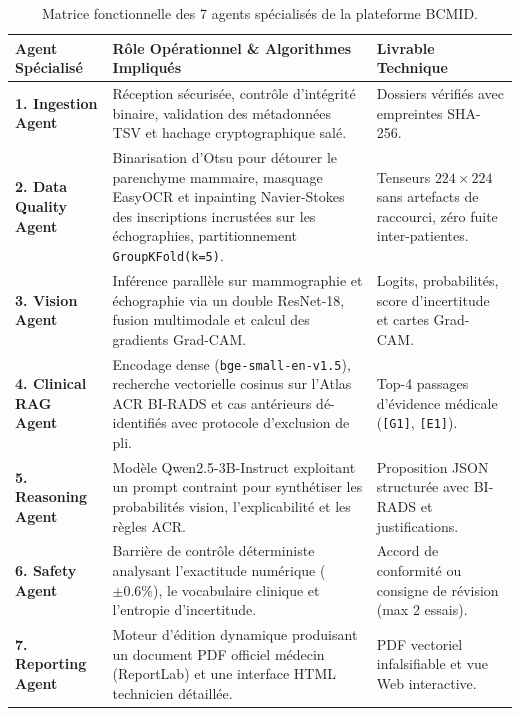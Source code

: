\documentclass[11pt,a4paper]{article}
\begin{document}
\begin{table}[htbp]
\centering
\small
\renewcommand{\arraystretch}{1.25}
\caption{Matrice fonctionnelle des 7 agents spécialisés de la plateforme BCMID.}
\label{tab:mas_matrix}
\begin{tabularx}{\linewidth}{|l|X|p{4.2cm}|}
\hline
\rowcolor{LightBlueBg}
\textbf{Agent Spécialisé} & \textbf{Rôle Opérationnel \& Algorithmes Impliqués} & \textbf{Livrable Technique} \\
\hline
\textbf{1. Ingestion Agent} & Réception sécurisée, contrôle d'intégrité binaire, validation des métadonnées TSV et hachage cryptographique salé. & Dossiers vérifiés avec empreintes SHA-256. \\
\hline
\textbf{2. Data Quality Agent} & Binarisation d'Otsu pour détourer le parenchyme mammaire, masquage EasyOCR et inpainting Navier-Stokes des inscriptions incrustées sur les échographies, partitionnement \texttt{GroupKFold(k=5)}. & Tenseurs $224\times 224$ sans artefacts de raccourci, zéro fuite inter-patientes. \\
\hline
\textbf{3. Vision Agent} & Inférence parallèle sur mammographie et échographie via un double ResNet-18, fusion multimodale et calcul des gradients Grad-CAM. & Logits, probabilités, score d'incertitude et cartes Grad-CAM. \\
\hline
\textbf{4. Clinical RAG Agent} & Encodage dense (\texttt{bge-small-en-v1.5}), recherche vectorielle cosinus sur l'Atlas ACR BI-RADS et cas antérieurs dé-identifiés avec protocole d'exclusion de pli. & Top-4 passages d'évidence médicale (\texttt{[G1]}, \texttt{[E1]}). \\
\hline
\textbf{5. Reasoning Agent} & Modèle Qwen2.5-3B-Instruct exploitant un prompt contraint pour synthétiser les probabilités vision, l'explicabilité et les règles ACR. & Proposition JSON structurée avec BI-RADS et justifications. \\
\hline
\textbf{6. Safety Agent} & Barrière de contrôle déterministe analysant l'exactitude numérique ($\pm 0.6\%$), le vocabulaire clinique et l'entropie d'incertitude. & Accord de conformité ou consigne de révision (max 2 essais). \\
\hline
\textbf{7. Reporting Agent} & Moteur d'édition dynamique produisant un document PDF officiel médecin (ReportLab) et une interface HTML technicien détaillée. & PDF vectoriel infalsifiable et vue Web interactive. \\
\hline
\end{tabularx}
\end{table}
\end{document}
